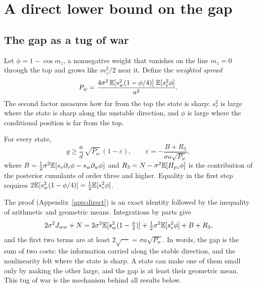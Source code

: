 \section{A direct lower bound on the gap}
\label{sec:direct}

\subsection{The gap as a tug of war}

Let $\phi = 1 - \cos m_z$, a nonnegative weight that vanishes on the line $m_z = 0$ through the top and grows like $m_z^2/2$ near it. Define the \emph{weighted spread}
\begin{equation}
P_w = \frac{4\sigma^2\,\mathbb{E}[s_w^2(1 - \phi/4)]\;\mathbb{E}[s_v^2\phi]}{a^2}.
\label{eq:Pw}
\end{equation}
The second factor measures how far from the top the state is sharp: $s_v^2$ is large where the state is sharp along the unstable direction, and $\phi$ is large where the conditional position is far from the top.

\begin{theorem}
\label{thm:direct}
For every state,
\begin{equation}
g \geq \frac{a}{d}\,\sqrt{P_w}\,(1 - \varepsilon),\qquad \varepsilon = -\frac{B + R_3}{\sigma a \sqrt{P_w}},
\label{eq:direct}
\end{equation}
where $B = \tfrac12\sigma^2\mathbb{E}[s_v\partial_v\phi - s_w\partial_w\phi]$ and $R_3 = N - \sigma^2\mathbb{E}[H_{pz}\phi]$ is the contribution of the posterior cumulants of order three and higher. Equality in the first step requires $2\mathbb{E}[s_w^2(1-\phi/4)] = \tfrac12\mathbb{E}[s_v^2\phi]$.
\end{theorem}

The proof (Appendix~\ref{app:direct}) is an exact identity followed by the inequality of arithmetic and geometric means. Integrations by parts give
\begin{equation}
2\sigma^2 J_{ww} + N = 2\sigma^2\mathbb{E}[s_w^2(1 - \tfrac{\phi}{4})] + \tfrac12\sigma^2\mathbb{E}[s_v^2\phi] + B + R_3,
\label{eq:identity}
\end{equation}
and the first two terms are at least $2\sqrt{\cdot\,\cdot} = \sigma a\sqrt{P_w}$. In words, the gap is the sum of two costs: the information carried along the stable direction, and the nonlinearity felt where the state is sharp. A state can make one of them small only by making the other large, and the gap is at least their geometric mean. This tug of war is the mechanism behind all results below.

